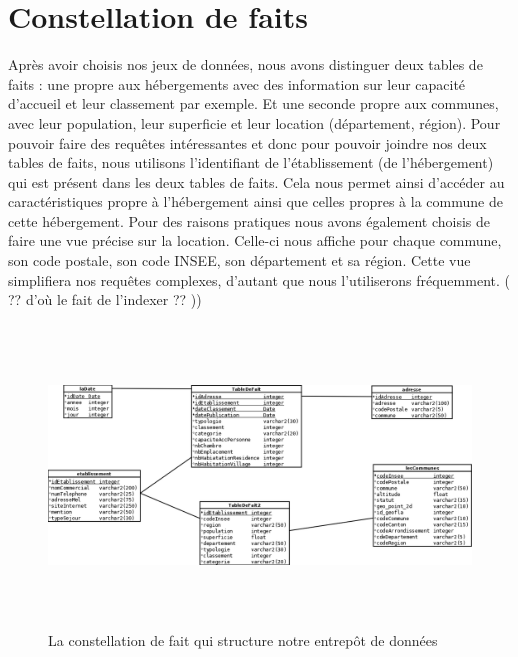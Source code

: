 \documentclass[a4paper,sffamily,12pt]{article}
\begin{document}
		\vspace{0.5cm}
		
	\section{Constellation de faits}

		\vspace{0.5cm}
			
		Après avoir choisis nos jeux de données, nous avons distinguer deux tables de faits : une propre aux hébergements avec des information sur leur capacité d'accueil et leur classement par exemple. Et une seconde propre aux communes, avec leur population, leur superficie et leur location (département, région). Pour pouvoir faire des requêtes intéressantes et donc pour pouvoir joindre nos deux tables de faits, nous utilisons l'identifiant de l'établissement (de l'hébergement) qui est présent dans les deux tables de faits. Cela nous permet ainsi d'accéder au caractéristiques propre à l'hébergement ainsi que celles propres à la commune de cette hébergement. Pour des raisons pratiques nous avons également choisis de faire une vue précise sur la location. Celle-ci nous affiche pour chaque commune, son code postale, son code INSEE, son département et sa région. Cette vue simplifiera nos requêtes complexes, d'autant que nous l'utiliserons fréquemment. ( ?? d'où le fait de l’indexer ?? )) \\
	
		\vspace{0.5cm}
		
		\begin{figure}[!h]
				
			\centerline{\includegraphics[height=8cm]{picture/constellation_de_fait.png}}
			\caption{La constellation de fait qui structure notre entrepôt de données}
			\label{constellation}
			
		\end{figure}	
		
\end{document}
